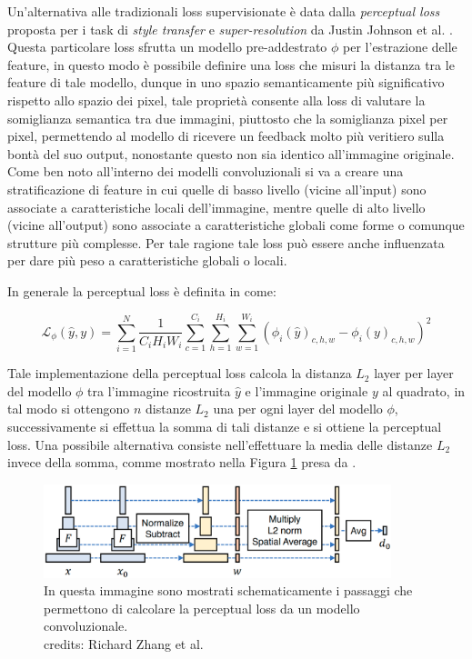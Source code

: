 Un'alternativa alle tradizionali loss supervisionate è data dalla \textit{perceptual loss} proposta per i task di \textit{style transfer}
e \textit{super-resolution} da Justin Johnson et al. \cite{johnson2016perceptual}. Questa particolare loss sfrutta un
modello pre-addestrato $\phi$ per l'estrazione delle feature, in questo modo è possibile definire una loss che misuri la distanza tra le feature
di tale modello, dunque in uno spazio semanticamente più significativo rispetto allo spazio dei pixel, tale proprietà consente alla loss di valutare
la somiglianza semantica tra due immagini, piuttosto che la somiglianza pixel per pixel, permettendo al modello di ricevere un feedback
molto più veritiero sulla bontà del suo output, nonostante questo non sia identico all'immagine originale.\\

Come ben noto all'interno dei modelli convoluzionali si va a creare una stratificazione di feature in cui quelle di basso livello (vicine all'input)
sono associate a caratteristiche locali dell'immagine, mentre quelle di alto livello (vicine all'output) sono associate a caratteristiche globali
come forme o comunque strutture più complesse. Per tale ragione tale loss può essere anche influenzata per dare più peso a caratteristiche globali o locali.

In generale la perceptual loss è definita in \cite{johnson2016perceptual} come:

\begin{equation}
    \mathcal{L}_{\phi}(\hat{y}, y) = \sum_{i=1}^{N} \frac{1}{C_i H_i W_i} \sum_{c=1}^{C_i} \sum_{h=1}^{H_i} \sum_{w=1}^{W_i} \left( \phi_i(\hat{y})_{c,h,w} - \phi_i(y)_{c,h,w} \right)^2
\end{equation}

Tale implementazione della perceptual loss calcola la distanza $L_2$ layer per layer del modello $\phi$ tra l'immagine ricostruita $\hat{y}$ e l'immagine originale $y$ al quadrato,
in tal modo si ottengono $n$ distanze $L_2$ una per ogni layer del modello $\phi$, successivamente si effettua la somma di tali distanze e si ottiene 
la perceptual loss. Una possibile alternativa consiste nell'effettuare la media delle distanze $L_2$ invece della somma, comme mostrato nella
Figura \ref{fig:perceptual_loss} presa da \cite{zhang2018unreasonable}.\\

\begin{figure}[H]
    \centering
    \includegraphics[width=0.9\textwidth]{imgs/perceptual_loss.png}
    \caption{In questa immagine sono mostrati schematicamente i passaggi che permettono di calcolare la perceptual loss da un modello convoluzionale.\\
        credits: Richard Zhang et al. \cite{zhang2018unreasonable}}
    \label{fig:perceptual_loss}
\end{figure}

